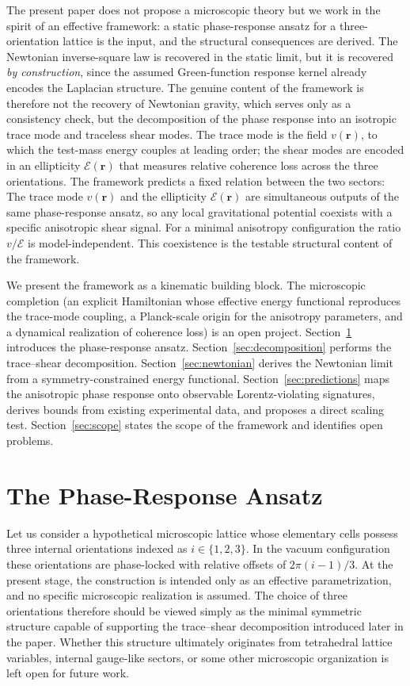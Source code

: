 \documentclass[a4paper,fleqn]{cas-dc}
\theoremstyle{thmstyleone}%
\theoremstyle{thmstyletwo}%
\begin{document}
The present paper does not propose a microscopic theory but we
work in the spirit of an effective framework: a static
phase-response ansatz for a three-orientation lattice is the
input, and the structural consequences are derived. The
Newtonian inverse-square law is recovered in the static limit,
but it is recovered \emph{by construction}, since the assumed
Green-function response kernel already encodes the Laplacian
structure. The genuine content of the framework is therefore
not the recovery of Newtonian gravity, which serves only as a
consistency check, but the decomposition of the phase response
into an isotropic trace mode and traceless shear modes. The
trace mode is the field $v(\mathbf{r})$, to which the
test-mass energy couples at leading order; the shear modes are
encoded in an ellipticity $\mathcal{E}(\mathbf{r})$ that
measures relative coherence loss across the three
orientations. The framework predicts a fixed relation between the two
sectors: The trace mode $v(\mathbf{r})$ and the
ellipticity $\mathcal{E}(\mathbf{r})$ are simultaneous
outputs of the same phase-response ansatz, so any
local gravitational potential coexists with a specific
anisotropic shear signal. For a minimal anisotropy
configuration the ratio $v/\mathcal{E}$ is
model-independent. This coexistence is the testable
structural content of the framework.

We present the framework as a kinematic building block. The
microscopic completion (an explicit Hamiltonian whose effective
energy functional reproduces the trace-mode coupling, a
Planck-scale origin for the anisotropy parameters, and a
dynamical realization of coherence loss) is an open project.
Section~\ref{sec:ansatz} introduces the phase-response ansatz.
Section~\ref{sec:decomposition} performs the trace--shear
decomposition.
Section~\ref{sec:newtonian} derives the Newtonian limit from a
symmetry-constrained energy functional.
Section~\ref{sec:predictions} maps the anisotropic phase response 
onto observable Lorentz-violating signatures, derives bounds from 
existing experimental data, and proposes a direct scaling test.
Section~\ref{sec:scope} states the scope of the framework and
identifies open problems.


\section{The Phase-Response Ansatz}
\label{sec:ansatz}

Let us consider a hypothetical microscopic lattice whose elementary
cells possess three internal orientations indexed as
$i\in\{1,2,3\}$. In the vacuum configuration these orientations
are phase-locked with relative offsets of 
$2\pi(i-1)/3$. At the present stage, the construction is intended
only as an effective parametrization, and no specific
microscopic realization is assumed. The choice of three
orientations therefore should be viewed simply as the minimal
symmetric structure capable of supporting the trace--shear
decomposition introduced later in the paper. Whether this
structure ultimately originates from tetrahedral lattice
variables, internal gauge-like sectors, or some other microscopic
organization is left open for future work.
\end{document}
